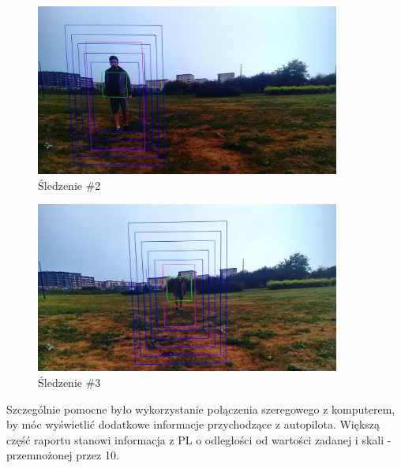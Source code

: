 \begin{figure}[h]
	\centering
	\includegraphics[width=10cm]{6_track_2.jpg}
	\caption{Śledzenie \#2}
	\label{fig:track_1}
\end{figure}

\begin{figure}[h]
	\centering
	\includegraphics[width=10cm]{6_track_3.jpg}
	\caption{Śledzenie \#3}
	\label{fig:track_1}
\end{figure}

Szczególnie pomocne było wykorzystanie połączenia szeregowego z komputerem, by móc wyświetlić dodatkowe informacje przychodzące z autopilota. Większą część raportu stanowi informacja z PL o odległości od wartości zadanej i skali - przemnożonej przez 10.


